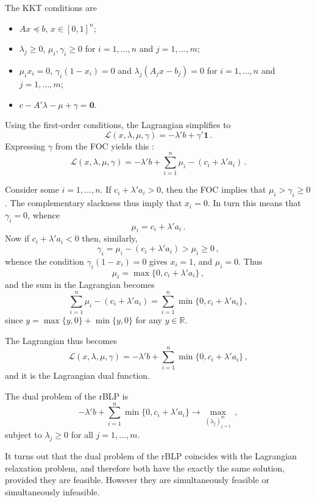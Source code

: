 \documentclass[a4paper]{article}
\newcommand{\Real}{\mathbb{R}}
\newcommand{\Lcal}{\mathcal{L}}
\newcommand{\one}{\mathbf{1}}
\begin{document}
The KKT conditions are \begin{itemize}
	\item $Ax\preceq b$, $x\in [0,1]^n$;
	\item $\lambda_j\geq0$, $\mu_i,\gamma_i\geq0$ for $i=1,\ldots,n$ and $j=1,\ldots,m$;
	\item $\mu_i x_i = 0$, $\gamma_i (1 - x_i)= 0$ and $\lambda_j (A_jx - b_j) = 0$
	for $i=1,\ldots,n$ and $j=1,\ldots,m$;
	\item $c - A'\lambda - \mu + \gamma = \mathbf{0}$.
\end{itemize}
Using the first-order conditions, the Lagrangian simplifies to
\[ \Lcal( x, \lambda, \mu, \gamma ) = - \lambda'b + \gamma'\one \,. \]
Expressing $\gamma$ from the FOC yields this :
\[
\Lcal( x, \lambda, \mu, \gamma )
	= - \lambda'b + \sum_{i=1}^n \mu_i - (c_i + \lambda'a_i) \,.
\]

Consider some $i=1,\ldots, n$. If $c_i + \lambda'a_i > 0$, then the FOC implies
that $\mu_i > \gamma_i\geq 0$. The complementary slackness thus imply that $x_i = 0$.
In turn this means that $\gamma_i=0$, whence 
\[ \mu_i = c_i + \lambda'a_i \,. \]
Now if $c_i + \lambda'a_i < 0$ then, similarly, 
\[ \gamma_i = \mu_i - (c_i + \lambda'a_i) > \mu_i \geq 0\,, \]
whence the condition $\gamma_i (1-x_i)= 0$ gives $x_i = 1$, and $\mu_i = 0$.
Thus 
\[ \mu_i = \max\{0,c_i + \lambda'a_i\} \,, \]
and the sum in the Lagrangian becomes
\[
\sum_{i=1}^n \mu_i - (c_i + \lambda'a_i)
= \sum_{i=1}^n \min\{0,c_i + \lambda'a_i\}\,,
\]
since $y = \max\{y,0\} + \min\{y,0\}$ for any $y\in \Real$.

The Lagrangian thus becomes
\[
\Lcal( x, \lambda, \mu, \gamma )
	= - \lambda'b + \sum_{i=1}^n \min\{0,c_i + \lambda'a_i\} \,,
\]
and it is the Lagrangian dual function.

The dual problem of the rBLP is 
\[
- \lambda'b + \sum_{i=1}^n \min\{0,c_i + \lambda'a_i\} \to \max_{(\lambda_j)_{j=1}^m}\,,
\]
subject to $\lambda_j\geq 0$ for all $j=1,\ldots,m$.

It turns out that the dual problem of the rBLP coincides with the Lagrangian
relaxation problem, and therefore both have the exactly the same solution, provided
they are feasible. However they are simultaneously feasible or simultaneously
infeasible.

\end{document}
